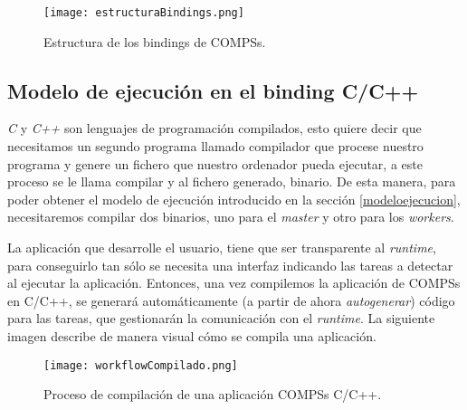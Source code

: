 \begin{figure}[H]
    \centering 
    \caption{Estructura de los bindings de COMPSs.}
    \texttt{[image: estructuraBindings.png]}
    \label{fig:estructura_bindings}
\end{figure}

\subsection{Modelo de ejecución en el binding C/C++}
\label{sec:bindings}

\textit{C} y \textit{C++} son lenguajes de programación compilados, esto quiere decir que necesitamos un segundo programa llamado compilador que procese nuestro programa y genere un fichero que nuestro ordenador pueda ejecutar, a este proceso se le llama compilar y al fichero generado, binario. De esta manera, para poder obtener el modelo de ejecución introducido en la sección \ref{modeloejecucion}, necesitaremos compilar dos binarios, uno para el \textit{master} y otro para los \textit{workers}.
\par\bigskip

\begin{comment}
La aplicación que desarrolla el usuario, \textit{a priori} no envía las tareas a ejecutar ni las dependencias entre estas, no gestiona el \textit{runtime}, pero es desarrollada siguiendo unas directrices que nos permitirán generar código que sí gestione todo lo que es necesario con tal de que la aplicación se distribuya correctamente. 
\end{comment}

La aplicación que desarrolle el usuario, tiene que ser transparente al \textit{runtime}, para conseguirlo tan sólo se necesita una interfaz indicando las tareas a detectar al ejecutar la aplicación. Entonces, una vez compilemos la aplicación de COMPSs en C/C++, se generará automáticamente (a partir de ahora \textit{autogenerar}) código para las tareas, que gestionarán la comunicación con el \textit{runtime}.
\smallskip
La siguiente imagen describe de manera visual cómo se compila una aplicación. 

\begin{figure}[H]
    \centering 
    \caption{Proceso de compilación de una aplicación COMPSs C/C++.}
    \texttt{[image: workflowCompilado.png]}
    \label{fig:workflowcompilado}
\end{figure}

